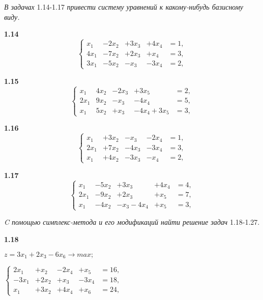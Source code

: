 \documentclass[10pt, a5paper, twoside]{article} %
\begin{document}
\textit{В задачах} 1.14-1.17 \textit{привести систему уравнений к какому-нибудь базисному виду.}

\begin{minipage}{0.4\textwidth}
 \textbf{1.14}
$$
\left\{
\begin{array}{ccccc}
x_1 &-2x_2 &+3x_3 &+4x_4 &=1, \\
4x_1 &-7x_2 &+2x_3 &+x_4 &=3, \\
3x_1 &-5x_2 &-x_3 &-3x_4 &=2,
\end{array}
\right.
$$
\end{minipage}
\hfill
\begin{minipage}{0.4\textwidth}
 \textbf{1.15}
$$
\left\{
\begin{array}{ccccc}
x_1 &4x_2 &-2x_3 &+3x_5 &=2, \\
2x_1 &9x_2 &-x_3 &-4x_4 &=5, \\
x_1 &5x_2 &+x_3 &-4x_4+3x_5 &=3,
\end{array}
\right.
$$
\end{minipage}

\begin{minipage}{0.4\textwidth}
 \textbf{1.16}
$$
\left\{
\begin{array}{ccccc}
x_1 &+3x_2 &-x_3 &-2x_4 &=1, \\
2x_1 &+7x_2 &-4x_3 &-3x_4 &=3, \\
x_1 &+4x_2 &-3x_3 &-x_4 &=2,
\end{array}
\right.
$$
\end{minipage}
\hfill
\begin{minipage}{0.4\textwidth}
 \textbf{1.17}
$$
\left\{
\begin{array}{ccccc}
x_1 &-5x_2 &+3x_3 &+4x_4 &=4, \\
2x_1 &-9x_2 &+2x_3 &+x_5 &=7, \\
x_1 &-4x_2 &-x_3-4x_4 &+x_5 &=3,
\end{array}
\right.
$$
\end{minipage}
\vspace{6pt}

\textit{C помощью симплекс-метода и его модификаций найти решение задач} 1.18-1.27.
\vspace{6pt}

\textbf{1.18}

$z=3x_1 + 2x_3 - 6x_6\rightarrow max;$

$
\left\{
\begin{array}{ccccc}
2x_1  &+x_2  &-2x_4  &+x_5  &=16, \\
-3x_1 &+2x_2 &+x_3   &-3x_4 &=18, \\
x_1   &+3x_2 &+4x_4  &+x_6  &=24,
\end{array}
\right.
$
\end{document}
